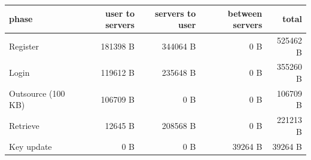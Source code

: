 \begin{tabular}{lrrrr}
\toprule
\textbf{phase} & \textbf{user to servers} & \textbf{servers to user} & \textbf{between servers} & \textbf{total} \\
\midrule
Register & 181398 B & 344064 B & 0 B & 525462 B \\
Login & 119612 B & 235648 B & 0 B & 355260 B \\
Outsource (100 KB) & 106709 B & 0 B & 0 B & 106709 B \\
Retrieve & 12645 B & 208568 B & 0 B & 221213 B \\
Key update & 0 B & 0 B & 39264 B & 39264 B \\
\bottomrule
\end{tabular}
